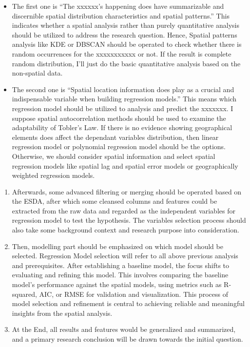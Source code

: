 \documentclass[
]{article}
\providecommand{\tightlist}{%
  \setlength{\itemsep}{0pt}\setlength{\parskip}{0pt}}
\begin{document}
\begin{itemize}
\tightlist
\item
  The first one is ``The xxxxxx's happening does have summarizable and
  discernible spatial distribution characteristics and spatial
  patterns.'' This indicates whether a spatial analysis rather than
  purely quantitative analysis should be utilized to address the
  research question. Hence, Spatial patterns analysis like KDE or DBSCAN
  should be operated to check whether there is random occurrences for
  the xxxxxxxxxxx or not. If the result is complete random distribution,
  I'll just do the basic quantitative analysis based on the non-spatial
  data.
\item
  The second one is ``Spatial location information does play as a
  crucial and indispensable variable when building regression models.''
  This means which regression model should be utilized to analysis and
  predict the xxxxxxx. I suppose spatial autocorrelation methods should
  be used to examine the adaptability of Tobler's
  Law.\citep{tobler_computer_1970} If there is no evidence showing
  geographical elements does affect the dependant variables
  distribution, then linear regression model or polynomial regression
  model should be the options. Otherwise, we should consider spatial
  information and select spatial regression models like spatial lag and
  spatial error models or geographically weighted regression models.
\end{itemize}

\begin{enumerate}
\def\labelenumi{\arabic{enumi}.}
\setcounter{enumi}{3}
\item
  Afterwards, some advanced filtering or merging should be operated
  based on the ESDA, after which some cleansed columns and features
  could be extracted from the raw data and regarded as the independent
  variables for regression model to test the hypothesis. The variables
  selection process should also take some background context and
  research purpose into consideration.
\item
  Then, modelling part should be emphasized on which model should be
  selected. Regression Model selection will refer to all above previous
  analysis and prerequisites. After establishing a baseline model, the
  focus shifts to evaluating and refining this model. This involves
  comparing the baseline model's performance against the spatial models,
  using metrics such as R-squared, AIC, or RMSE for validation and
  visualization. This process of model selection and refinement is
  central to achieving reliable and meaningful insights from the spatial
  analysis.
\item
  At the End, all results and features would be generalized and
  summarized, and a primary research conclusion will be drawn towards
  the initial question.
\end{enumerate}
\end{document}
